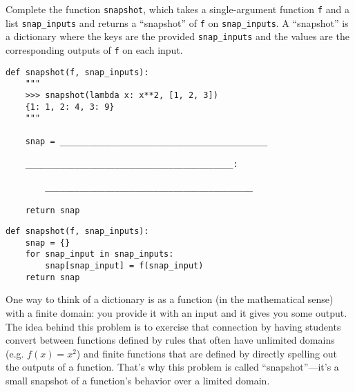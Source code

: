 \begin{blocksection}
\question Complete the function \lstinline{snapshot}, which takes a single-argument function \lstinline{f} and a list \lstinline{snap_inputs} and returns a ``snapshot'' of \lstinline{f} on \lstinline{snap_inputs}. A ``snapshot'' is a dictionary where the keys are the provided \lstinline{snap_inputs} and the values are the corresponding outputs of \lstinline{f} on each input.

\begin{lstlisting}
def snapshot(f, snap_inputs):
    """
    >>> snapshot(lambda x: x**2, [1, 2, 3])
    {1: 1, 2: 4, 3: 9}
    """

    snap = __________________________________________

    __________________________________________:

        __________________________________________
        
    return snap
\end{lstlisting}

\begin{solution}
\begin{lstlisting}
def snapshot(f, snap_inputs):
    snap = {}
    for snap_input in snap_inputs:
        snap[snap_input] = f(snap_input)
    return snap
\end{lstlisting}
\end{solution}
\end{blocksection}

\begin{questionmeta}
One way to think of a dictionary is as a function (in the mathematical sense) with a finite domain: you provide it with an input and it gives you some output. The idea behind this problem is to exercise that connection by having students convert between functions defined by rules that often have unlimited domains (e.g. $f(x) = x^2$) and finite functions that are defined by directly spelling out the outputs of a function. That's why this problem is called ``snapshot''---it's a small snapshot of a function's behavior over a limited domain. 
\end{questionmeta}
